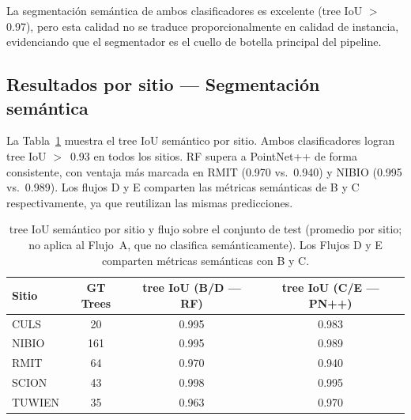 \documentclass[runningheads]{llncs}
\begin{document}
La segmentaci\'on sem\'antica de ambos clasificadores es excelente (tree IoU $>$ 0.97), pero esta calidad no se traduce proporcionalmente en calidad de instancia, evidenciando que el segmentador es el cuello de botella principal del pipeline.

\begin{table}[t]
\centering
\caption{Resultados agregados sobre el conjunto de test de FOR-instance V1. Las m\'etricas de instancia usan IoU 3D~$\geq 0.5$ como umbral de TP. Los promedios son no ponderados sobre los 11~plots.}\label{tab:results-agg}
\end{table}

\subsection{Resultados por sitio --- Segmentaci\'on sem\'antica}

La Tabla~\ref{tab:results-seg-site} muestra el tree IoU sem\'antico por sitio. Ambos clasificadores logran tree IoU $>$~0.93 en todos los sitios. RF supera a PointNet++ de forma consistente, con ventaja m\'as marcada en RMIT (0.970 vs.\ 0.940) y NIBIO (0.995 vs.\ 0.989). Los flujos D y E comparten las m\'etricas sem\'anticas de B y C respectivamente, ya que reutilizan las mismas predicciones.

\begin{table}[t]
\centering
\caption{tree IoU sem\'antico por sitio y flujo sobre el conjunto de test (promedio por sitio; no aplica al Flujo~A, que no clasifica sem\'anticamente). Los Flujos D y E comparten m\'etricas sem\'anticas con B y C.}\label{tab:results-seg-site}
\begin{tabular}{lccc}
\toprule
Sitio & GT Trees & tree IoU (B/D --- RF) & tree IoU (C/E --- PN++) \\
\midrule
CULS   & 20  & 0.995 & 0.983 \\
NIBIO  & 161 & 0.995 & 0.989 \\
RMIT   & 64  & 0.970 & 0.940 \\
SCION  & 43  & 0.998 & 0.995 \\
TUWIEN & 35  & 0.963 & 0.970 \\
\bottomrule
\end{tabular}
\end{table}
\end{document}
